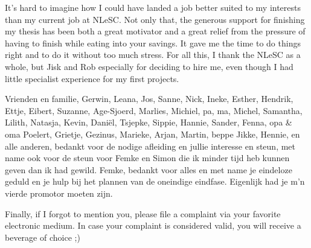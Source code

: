 It's hard to imagine how I could have landed a job better suited to my interests than my current job at NLeSC.\@
Not only that, the generous support for finishing my thesis has been both a great motivator and a great relief from the pressure of having to finish while eating into your savings.
It gave me the time to do things right and to do it without too much stress.
For all this, I thank the NLeSC as a whole, but Jisk and Rob especially for deciding to hire me, even though I had little specialist experience for my first projects.


Vrienden en familie, Gerwin, Leana, Jos, Sanne, Nick, Ineke, Esther, Hendrik, Ettje, Eibert, Suzanne, Age-Sjoerd, Marlies, Michiel, pa, ma, Michel, Samantha, Lilith, Natasja, Kevin, Dani\"{e}l, Tsjepke, Sippie, Hannie, Sander, Fenna, opa \& oma Poelert, Grietje, Gezinus, Marieke, Arjan, Martin, beppe Jikke, Hennie, en alle anderen, bedankt voor de nodige afleiding en jullie interesse en steun, met name ook voor de steun voor Femke en Simon die ik minder tijd heb kunnen geven dan ik had gewild.
Femke, bedankt voor alles en met name je eindeloze geduld en je hulp bij het plannen van de oneindige eindfase.
Eigenlijk had je m'n vierde promotor moeten zijn.


Finally, if I forgot to mention you, please file a complaint via your favorite electronic medium.
In case your complaint is considered valid, you will receive a beverage of choice ;)

